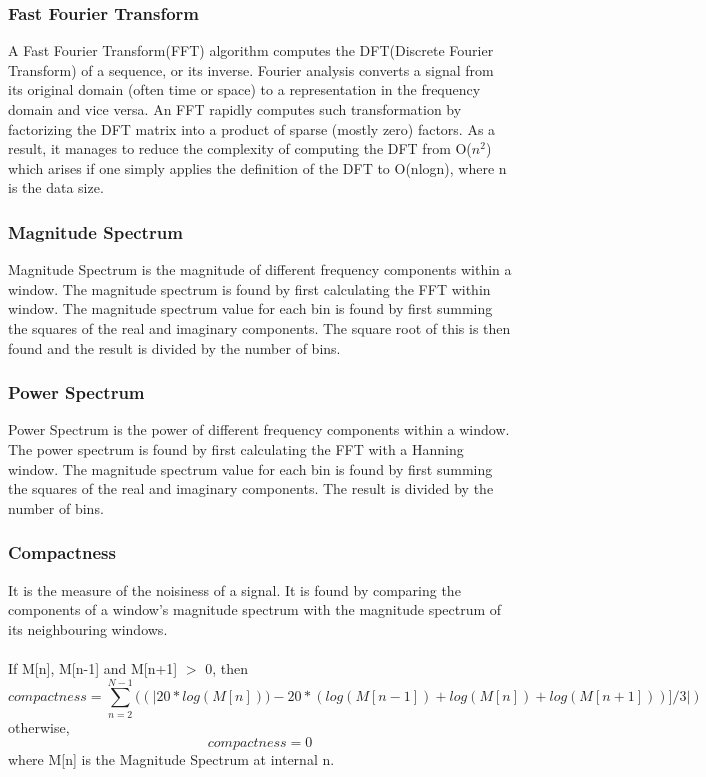 \subsubsection{Fast Fourier Transform}
A Fast Fourier Transform(FFT) algorithm computes the DFT(Discrete Fourier Transform) of a sequence, or its inverse. Fourier analysis converts a signal from its original domain (often time or space) to a representation in the frequency domain and vice versa. An FFT rapidly computes such transformation by factorizing the DFT matrix into a product of sparse (mostly zero) factors. As a result, it manages to reduce the complexity of computing the DFT from O($n^2$) which arises if one simply applies the definition of the DFT to O(nlogn), where n is the data size. 

\subsubsection{Magnitude Spectrum}
Magnitude Spectrum is the magnitude of different frequency components within a window. The magnitude spectrum is found by first calculating the FFT within window. The magnitude spectrum value for each bin is found by first summing the squares of the real and imaginary components. The square root of this is then found and the result is divided by the number of bins.

\subsubsection{Power Spectrum}
Power Spectrum is the power of different frequency components within a window. The power spectrum is found by first calculating the FFT with a Hanning window. The magnitude spectrum value for each bin is found by first summing the squares of the real and imaginary components. The result is divided by the number of bins.

\subsubsection{Compactness}
It is the measure of the noisiness of a signal. It is found by comparing the 
components of a window’s magnitude spectrum with the magnitude spectrum of its  
neighbouring windows.\\ 
\\
If M[n], M[n-1] and M[n+1] $>$ 0, then
\begin{equation}
        compactness = \sum_{n=2}^{N-1}{((|20*log(M[n]))-20*(log(M[n-1])+log(M[n])+log(M[n+1]))]/3|)}
\end{equation}
otherwise,
\begin{equation}
        compactness = 0
\end{equation}
where M[n] is the Magnitude Spectrum at internal n.

